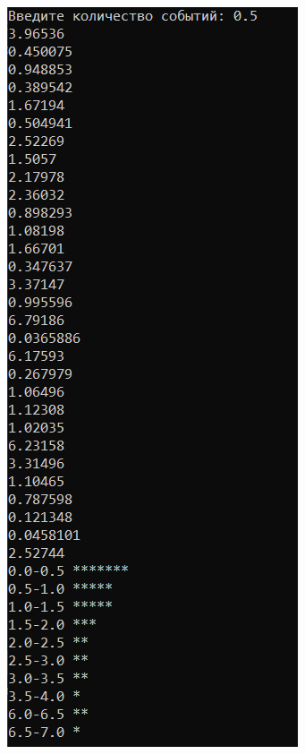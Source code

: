 \documentclass{beamer}
\begin{document}
\begin{frame}
\begin{columns}[t]
\begin{column}{0.25\textwidth}
\end{column}
\begin{column}{0.25\textwidth}
\includegraphics[width=\textwidth]{exp_dist3.png}
\end{column}
\end{columns}
\end{frame}
\end{document}
